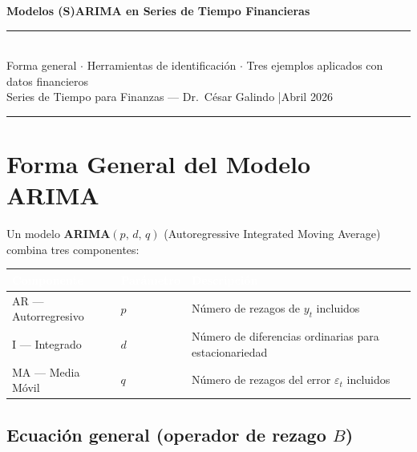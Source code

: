 \documentclass[12pt,letterpaper]{article}
\begin{document}
\begin{center}
  {\LARGE\bfseries\color{navy} Modelos (S)ARIMA en Series de Tiempo Financieras}\\[6pt]
  {\color{blue2}\rule{\linewidth}{1.5pt}}\\[4pt]
  {\normalsize Forma general $\cdot$ Herramientas de identificación $\cdot$
               Tres ejemplos aplicados con datos financieros}\\[4pt]
  {\small Series de Tiempo para Finanzas --- Dr.\ César Galindo \quad|\quad Abril 2026}
\end{center}

\vspace{4pt}
{\color{navy}\rule{\linewidth}{0.5pt}}
\vspace{8pt}

\section{Forma General del Modelo ARIMA}

Un modelo \textbf{ARIMA$(p,\,d,\,q)$} (Autoregressive Integrated Moving Average)
combina tres componentes:

\vspace{4pt}
\begin{center}
\renewcommand{\arraystretch}{1.3}
\begin{tabular}{@{}lll@{}}
\toprule
\rowcolor{navy}\textcolor{white}{\textbf{Componente}} &
\textcolor{white}{\textbf{Parámetro}} &
\textcolor{white}{\textbf{Descripción}} \\
\midrule
\rowcolor{rowA} AR --- Autorregresivo & $p$ & Número de rezagos de $y_t$ incluidos \\
I  --- Integrado    & $d$ & Número de diferencias ordinarias para estacionariedad \\
\rowcolor{rowA} MA --- Media Móvil & $q$ & Número de rezagos del error $\varepsilon_t$ incluidos \\
\bottomrule
\end{tabular}
\end{center}

\subsection{Ecuación general (operador de rezago \texorpdfstring{$B$}{B})}
\end{document}
